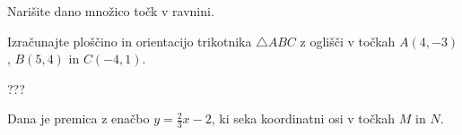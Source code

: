 \documentclass[addpoints]{exam}
\begin{document}
\begin{questions}


    \question
    Narišite dano množico točk v ravnini.
    \begin{parts}
        \part[4]
        $[-2,1)\times [2,\infty)$

            \begin{solution}[7cm]
                ????
            \end{solution}

        \part[4]
        $\left\{(x,y)\in\mathbb{R}^2 \mid (y>-1)\land (y=x)\right\} $

            \begin{solution}[5.5cm]
                ????
            \end{solution}

    \end{parts}
    
    
    \newpage

    \question[4]
    Izračunajte ploščino in orientacijo trikotnika $\triangle ABC$ z oglišči v točkah $A(4,-3)$, $B(5,4)$ in $C(-4,1)$.
    
    
    \begin{solution}[5cm]
        ???
    \end{solution}

        


    \question
    Dana je premica z enačbo $y=\frac{2}{3}x-2$, ki seka koordinatni osi v točkah $M$ in $N$.

\end{questions}
\end{document}
